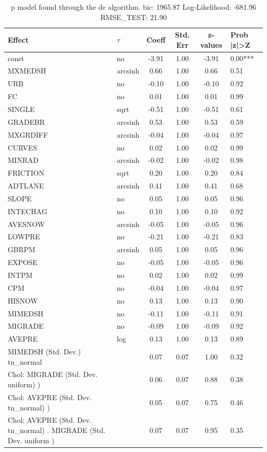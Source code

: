 \begin{table}
	\caption{p model found through the de algorithm. bic: 1965.87 Log-Likelihood: -681.96 RMSE_TEST: 21.90}
	\begin{center}
		\begin{tabular}{|l|l|c|c|c|l|}
			\hline
			Effect & $\tau$ & Coeff & Std. Err & z-values & Prob |z|>Z \\
			\hline
			const & no & -3.91 & 1.00 & -3.91 & 0.00*** \\
			\hline
			MXMEDSH & arcsinh & 0.66 & 1.00 & 0.66 & 0.51 \\
			\hline
			URB & no & -0.10 & 1.00 & -0.10 & 0.92 \\
			\hline
			FC & no & 0.01 & 1.00 & 0.01 & 0.99 \\
			\hline
			SINGLE & sqrt & -0.51 & 1.00 & -0.51 & 0.61 \\
			\hline
			GRADEBR & arcsinh & 0.53 & 1.00 & 0.53 & 0.59 \\
			\hline
			MXGRDIFF & arcsinh & -0.04 & 1.00 & -0.04 & 0.97 \\
			\hline
			CURVES & no & 0.02 & 1.00 & 0.02 & 0.99 \\
			\hline
			MINRAD & arcsinh & -0.02 & 1.00 & -0.02 & 0.98 \\
			\hline
			FRICTION & sqrt & 0.20 & 1.00 & 0.20 & 0.84 \\
			\hline
			ADTLANE & arcsinh & 0.41 & 1.00 & 0.41 & 0.68 \\
			\hline
			SLOPE & no & 0.05 & 1.00 & 0.05 & 0.96 \\
			\hline
			INTECHAG & no & 0.10 & 1.00 & 0.10 & 0.92 \\
			\hline
			AVESNOW & arcsinh & -0.05 & 1.00 & -0.05 & 0.96 \\
			\hline
			LOWPRE & no & -0.21 & 1.00 & -0.21 & 0.83 \\
			\hline
			GBRPM & arcsinh & 0.05 & 1.00 & 0.05 & 0.96 \\
			\hline
			EXPOSE & no & -0.05 & 1.00 & -0.05 & 0.96 \\
			\hline
			INTPM & no & 0.02 & 1.00 & 0.02 & 0.99 \\
			\hline
			CPM & no & -0.04 & 1.00 & -0.04 & 0.97 \\
			\hline
			HISNOW & no & 0.13 & 1.00 & 0.13 & 0.90 \\
			\hline
			MIMEDSH & no & -0.11 & 1.00 & -0.11 & 0.91 \\
			\hline
			MIGRADE & no & -0.09 & 1.00 & -0.09 & 0.92 \\
			\hline
			AVEPRE & log & 0.13 & 1.00 & 0.13 & 0.89 \\
			\hline
			MIMEDSH (Std. Dev.) tn_normal &  & 0.07 & 0.07 & 1.00 & 0.32 \\
			\hline
			 Chol: MIGRADE (Std. Dev. uniform) ) &  & 0.06 & 0.07 & 0.88 & 0.38 \\
			\hline
			 Chol: AVEPRE (Std. Dev. tn_normal) ) &  & 0.05 & 0.07 & 0.75 & 0.46 \\
			\hline
			 Chol: AVEPRE (Std. Dev. tn_normal) . MIGRADE (Std. Dev.   uniform ) &  & 0.07 & 0.07 & 0.95 & 0.35 \\
			\hline
		\end{tabular}
	\end{center}
\end{table}